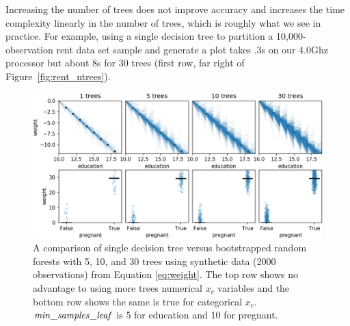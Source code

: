 \documentclass[12pt]{article}
\newcommand{\figref}[1]{Figure~\ref{#1}}
\begin{document}
Increasing the number of trees does not improve accuracy and increases the time complexity linearly in the number of trees, which is roughly what we see in practice.  For example, using a single decision tree to partition a 10,000-observation rent data set sample and generate a plot takes .3s on our 4.0Ghz processor but about 8s for 30 trees (first row, far right of \figref{fig:rent_ntrees}).

\begin{figure}[htbp]
\begin{center}
\includegraphics[scale=0.55]{images/education_pregnant_vs_weight_ntrees.png}
\caption{A comparison of single decision tree versus bootstrapped random forests with 5, 10, and 30 trees using synthetic data (2000 observations) from Equation \eqref{eq:weight}. The top row shows no advantage to using more trees numerical $x_c$ variables and the bottom row shows the same is true for categorical $x_c$. ${\it min\_samples\_leaf}$ is 5 for education and 10 for pregnant.}
\label{fig:weight_ntrees}
\end{center}
\end{figure}
\end{document}

